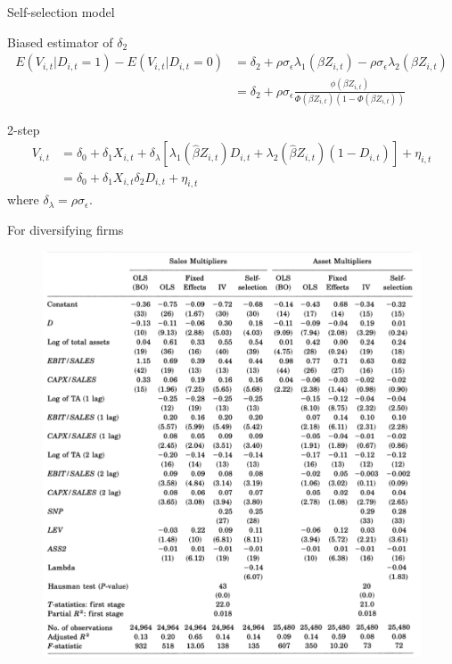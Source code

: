 \documentclass[aspectratio=169,xcolor=dvipsnames]{beamer}
\begin{document}
\begin{frame}{Self-selection model}
    \begin{block}{Biased estimator of $\delta_2$}
        \begin{equation}
            \begin{aligned}
                E(V_{i,t}| D_{i,t}=1) - E(V_{i,t}| D_{i,t}=0) & = \delta_2 + \rho \sigma_{\epsilon} \lambda_1 (\beta Z_{i,t}) - \rho \sigma_{\epsilon} \lambda_2 (\beta Z_{i,t}) \\
                                                              & = \delta_2 + \rho \sigma_{\epsilon} \frac{\phi(\beta Z_{i,t})}{\Phi(\beta Z_{i,t})(1-\Phi(\beta Z_{i,t}))}
            \end{aligned}
        \end{equation}
    \end{block}
    \begin{block}{2-step}
        \begin{equation}
            \begin{aligned}
                V_{i,t} & = \delta_0 + \delta_1 X_{i ,t} + \delta_{\lambda} [\lambda_1(\hat{\beta} Z_{i,t})D_{i,t} + \lambda_2(\hat{\beta} Z_{i,t})(1-D_{i,t})] + \eta_{i,t} \\
                        & = \delta_0 + \delta_1 X_{i, t} \delta_2 D_{i, t} + \eta_{i, t}
            \end{aligned}
        \end{equation}
        where $\delta_{\lambda} = \rho \sigma_{\epsilon}$.
    \end{block}
\end{frame}

\begin{frame}{For diversifying firms}
    \begin{figure}
        \includegraphics[width=0.5\linewidth]{figures/table7.png}
        \caption{}
    \end{figure}
\end{frame}
\end{document}
